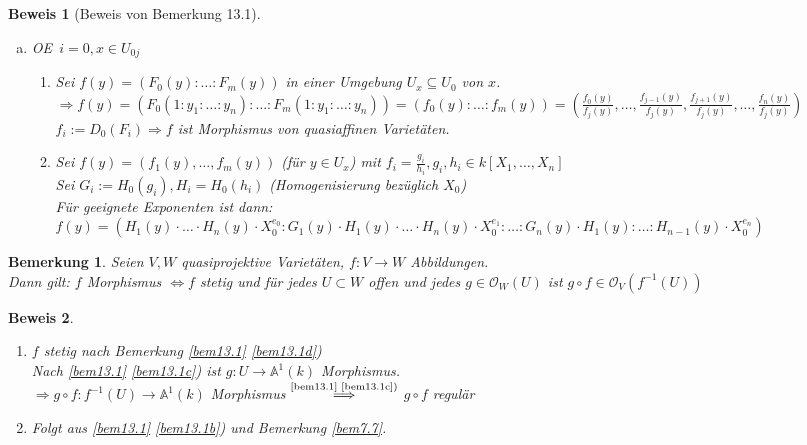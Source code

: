 \documentclass[a4paper,12pt]{report}
\theoremstyle{break}
\newtheorem{Bem}[Def]{Bemerkung}
\theoremstyle{nonumberbreak}
\newtheorem{Bew}{Beweis}
\theoremstyle{nonumberplain}
\newcommand{\quot}[1]{\textrm{\glqq}{#1}\textrm{\grqq}}
\newenvironment{twosidedproof}{\begin{enumerate}[\quot{$\Rightarrow$}:]}{\end{enumerate}}
\newcommand{\proofforward}{\item[\quot{$\Rightarrow$}:]}
\newcommand{\proofreverse}{\item[\quot{$\Leftarrow$}:]}
\newcommand{\A}{\mathbb{A}}
\newcommand{\calO}{\mathcal{O}}
\renewcommand{\OE}{O\!\!E~}
\begin{document}
\begin{Bew}[Beweis von Bemerkung 13.1]\begin{enumerate}[a)]
\item[b)]
	\OE $i=0,x\in U_{0j}$\begin{twosidedproof}
	\proofforward
		Sei $f(y)=(F_0(y):\ldots :F_m(y))$ in einer Umgebung $U_x\subseteq U_0$ von $x$.\\
		$\Rightarrow f(y)=(F_0(1:y_1:\ldots :y_n):\ldots :F_m(1:y_1:\ldots :y_n))=(f_0(y):\ldots :f_m(y))=(\frac{f_0(y)}{f_j(y)},\ldots ,\frac{f_{j-1}(y)}{f_j(y)}, \frac{f_{j+1}(y)}{f_j(y)},\ldots ,\frac{f_n(y)}{f_j(y)})$\\
		$f_i:=D_0(F_i)\Rightarrow f$ ist Morphismus von quasiaffinen Variet\"aten.

	\proofreverse
	Sei $f(y)=(f_1(y),\ldots ,f_m(y))$ (f\"ur $y\in U_x$) mit $f_i=\frac{g_i}{h_i}, g_i,h_i\in k[X_1,\ldots ,X_n]$\\
	Sei $G_i:=H_0(g_i), H_i=H_0(h_i)$ (Homogenisierung bez\"uglich $X_0$)\\
	F\"ur geeignete Exponenten ist dann:\\
		$f(y)=(H_1(y)\cdot\ldots \cdot H_n(y)\cdot X_0^{e_0}:G_1(y)\cdot H_1(y)\cdot\ldots \cdot H_n(y)\cdot X_0^{e_1}:\ldots :G_n(y)\cdot H_1(y):\ldots :H_{n-1}(y)\cdot X_0^{e_n})$
\end{twosidedproof}
\end{enumerate}\end{Bew}

\begin{Bem}
Seien $V,W$ quasiprojektive Variet\"aten, $f:V\to W$ Abbildungen.\\
Dann gilt: $f$ Morphismus $\Leftrightarrow f$ stetig und f\"ur jedes $U\subset W$ offen und jedes $g\in \calO_W(U)$ ist $g\circ f \in \calO_V(f^{-1}(U))$
\end{Bem}

\begin{Bew}\begin{twosidedproof}
\proofforward
	$f$ stetig nach Bemerkung \ref{bem13.1} \ref{bem13.1d})\\
	Nach \ref{bem13.1} \ref{bem13.1c}) ist $g:U\to \A^1(k)$ Morphismus.\\
	$\Rightarrow g\circ f: f^{-1}(U)\to\A^1(k)$ Morphismus $\overset{\text{\ref{bem13.1} \ref{bem13.1c})}}{\Longrightarrow}$ $g\circ f$ regul\"ar
\proofreverse
	Folgt aus \ref{bem13.1} \ref{bem13.1b}) und Bemerkung \ref{bem7.7}.
\end{twosidedproof}\end{Bew}
\end{document}
